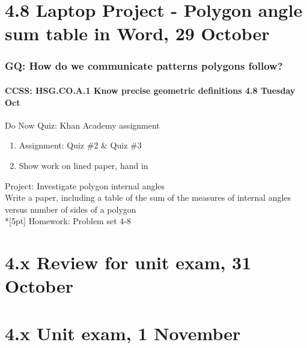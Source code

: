 \documentclass{beamer}
\begin{document}
\section{4.8 Laptop Project - Polygon angle sum table in Word, 29 October}
\frame
{
\frametitle{GQ: How do we communicate patterns polygons follow?}
\framesubtitle{CCSS: HSG.CO.A.1 Know precise geometric definitions \hfill \alert{4.8 Tuesday Oct}}

\begin{block}{Do Now Quiz: Khan Academy assignment}
\begin{enumerate}
  \item Assignment: Quiz \#2 \& Quiz \#3
  \item Show work on lined paper, hand in
\end{enumerate}
\end{block}
Project: Investigate polygon internal angles\\
Write a paper, including a table of the sum of the measures of internal angles versus number of sides of a polygon \\*[5pt]
Homework: Problem set 4-8
}

\section{4.x Review for unit exam, 31 October}

\section{4.x Unit exam, 1 November}
\end{document}
